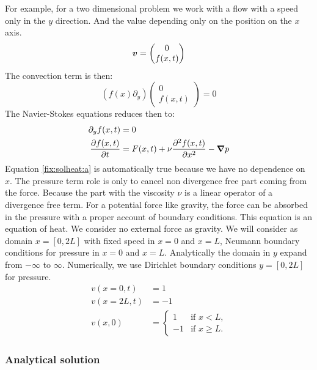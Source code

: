 For example, for a two dimensional problem we work with a flow with a speed only in the $y$ direction. And the value depending only on the position on the $x$ axis.
\begin{equation}
	{\boldsymbol {v}}=\begin{pmatrix}
	         	0\\f(x,t)
	         \end{pmatrix}
\end{equation}
The convection term is then:
\begin{equation}
	(f(x)\partial_{y})\begin{pmatrix}
	         	0\\f(x,t)
	         \end{pmatrix}=0
\end{equation}
The Navier-Stokes equations reduces then to:
\begin{align}
\label{fix:solheat:a}
	\partial_{y}f(x,t)&=0\\
	\frac{\partial f(x,t)}{\partial t}&=F(x,t)+\nu\frac{\partial^2 f(x,t)}{\partial x^2}-{\boldsymbol {\nabla}}p
\end{align}
Equation \ref{fix:solheat:a} is automatically true because we have no dependence on $x$.
The pressure term role is only to cancel non divergence free part coming from the force. Because the part with the viscosity $\nu$ is a linear operator
of a divergence free term.
For a potential force like gravity, the force can be absorbed in the pressure with a proper account of boundary conditions.
This equation is an equation of heat.
We consider no external force as gravity.
We will consider as domain $x=[0,2L]$ with fixed speed in $x=0$ and $x=L$,  Neumann boundary conditions for pressure in $x=0$ and $x=L$.
Analytically the domain in $y$ expand from $-\infty$ to $\infty$. Numerically, we use Dirichlet boundary conditions $y=[0,2L]$ for pressure.
\begin{align*}
    v(x=0,t)&=1\\
    v(x=2L,t)&=-1\\
    v(x,0)&=\begin{cases}
             1&\text{if $x<L$,}\\
             -1& \text{if $x\geq L$.}
            \end{cases}
\end{align*}

\subsubsection{Analytical solution}

